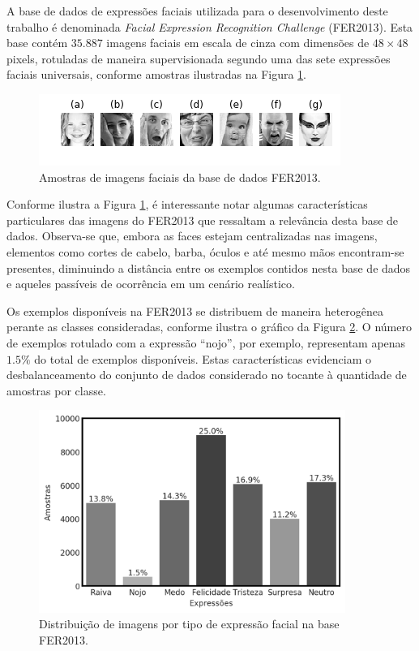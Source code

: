 A base de dados de expressões faciais utilizada para o desenvolvimento deste trabalho é denominada \emph{Facial Expression Recognition Challenge} (FER2013). Esta base contém $35.887$ imagens faciais em escala de cinza com dimensões de $48\times 48$ pixels, rotuladas de maneira supervisionada segundo uma das sete expressões faciais universais, conforme amostras ilustradas na Figura \ref{fig:samples}.

\begin{figure}[!htb]
    \centering
    \caption{Amostras de imagens faciais da base de dados FER2013.}
    \label{fig:samples}
    \includegraphics{images/samples.png}
\end{figure}

Conforme ilustra a Figura \ref{fig:samples}, é interessante notar algumas características particulares das imagens do FER2013 que ressaltam a relevância desta base de dados. Observa-se que, embora as faces estejam centralizadas nas imagens, elementos como cortes de cabelo, barba, óculos e até mesmo mãos encontram-se presentes, diminuindo a distância entre os exemplos contidos nesta base de dados e aqueles passíveis de ocorrência em um cenário realístico.

Os exemplos disponíveis na FER2013 se distribuem de maneira heterogênea perante as classes consideradas, conforme ilustra o gráfico da Figura \ref{fig:dataset}. O número de exemplos rotulado com a expressão ``nojo'', por exemplo, representam apenas $1.5\%$ do total de exemplos disponíveis. Estas características evidenciam o desbalanceamento do conjunto de dados considerado no tocante à quantidade de amostras por classe.

\begin{figure}[!htb]
    \centering
    \caption{Distribuição de imagens por tipo de expressão facial na base FER2013.}  \label{fig:dataset}
    \includegraphics[width=10cm]{images/expression_distribution.png}
\end{figure}
